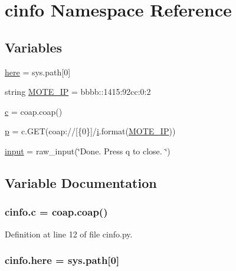 \hypertarget{namespacecinfo}{}\section{cinfo Namespace Reference}
\label{namespacecinfo}
\subsection*{Variables}
\begin{DoxyCompactItemize}
\item 
\hyperlink{namespacecinfo_a2d810763053cb13fa3beaaafbad095fa}{here} = sys.\+path\mbox{[}0\mbox{]}
\item 
string \hyperlink{namespacecinfo_a309730c64bf612297f7e4dd6ea988cb1}{M\+O\+T\+E\+\_\+\+IP} = \textquotesingle{}bbbb\+::1415\+:92cc\+:0\+:2\textquotesingle{}
\item 
\hyperlink{namespacecinfo_ac9e8d06595309337bddab162f71dba25}{c} = coap.\+coap()
\item 
\hyperlink{namespacecinfo_aa27f827c5a44f94ddbdbe36b7503e872}{p} = c.\+G\+ET(\textquotesingle{}coap\+://\mbox{[}\{0\}\mbox{]}/\hyperlink{pmc_8c_acb559820d9ca11295b4500f179ef6392}{i}\textquotesingle{}.format(\hyperlink{namespacecinfo_a309730c64bf612297f7e4dd6ea988cb1}{M\+O\+T\+E\+\_\+\+IP}))
\item 
\hyperlink{namespacecinfo_ae6d7eed2fc46abd34a0c47cd8f45f774}{input} = raw\+\_\+input(\char`\"{}Done. Press q to close. \char`\"{})
\end{DoxyCompactItemize}


\subsection{Variable Documentation}
\subsubsection[{\texorpdfstring{c}{c}}]{\setlength{\rightskip}{0pt plus 5cm}cinfo.\+c = coap.\+coap()}\hypertarget{namespacecinfo_ac9e8d06595309337bddab162f71dba25}{}\label{namespacecinfo_ac9e8d06595309337bddab162f71dba25}


Definition at line 12 of file cinfo.\+py.

\subsubsection[{\texorpdfstring{here}{here}}]{\setlength{\rightskip}{0pt plus 5cm}cinfo.\+here = sys.\+path\mbox{[}0\mbox{]}}\hypertarget{namespacecinfo_a2d810763053cb13fa3beaaafbad095fa}{}\label{namespacecinfo_a2d810763053cb13fa3beaaafbad095fa}


